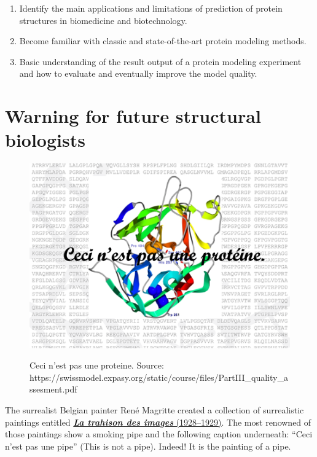 \documentclass[
  letterpaper,
  DIV=11,
  numbers=noendperiod]{scrreprt}
\begin{document}
\begin{enumerate}
\def\labelenumi{\arabic{enumi}.}
\item
  Identify the main applications and limitations of prediction of
  protein structures in biomedicine and biotechnology.
\item
  Become familiar with classic and state-of-the-art protein modeling
  methods.
\item
  Basic understanding of the result output of a protein modeling
  experiment and how to evaluate and eventually improve the model
  quality.
\end{enumerate}

\hypertarget{warning-for-future-structural-biologists}{%
\section{Warning for future structural
biologists}\label{warning-for-future-structural-biologists}}

\begin{figure}

{\centering 

\href{https://swissmodel.expasy.org/static/course/files/PartIII_quality_assesment.pdf}{\includegraphics{./pics/magritte.png}}

}

\caption{Ceci n'est pas une proteine. Source:
https://swissmodel.expasy.org/static/course/files/PartIII\_quality\_assesment.pdf}

\end{figure}

The surrealist Belgian painter René Magritte created a collection of
surrealistic paintings entitled
\href{https://en.wikipedia.org/wiki/The_Treachery_of_Images}{\textbf{\emph{La
trahison des images}} (1928--1929)}. The most renowned of those
paintings show a smoking pipe and the following caption underneath:
``Ceci n'est pas une pipe'' (This is not a pipe). Indeed! It is the
painting of a pipe.
\end{document}
